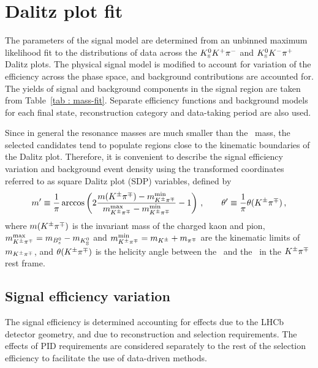 \section{Dalitz plot fit}
\label{sec:dalitz}

The parameters of the signal model are determined from an unbinned maximum likelihood fit to the distributions of data across the ${{K}^0_{\mathrm{ \scriptscriptstyle S}}}{{K}^+}{{\pi}^-}$ and ${{K}^0_{\mathrm{ \scriptscriptstyle S}}}{{K}^-}{{\pi}^+}$ Dalitz plots.  
The physical signal model is modified to account for variation of the efficiency across the phase space, and background contributions are accounted for.
The yields of signal and background components in the signal region are taken from Table~\ref{tab : mass-fit}.
Separate efficiency functions and background models for each final state, \KS reconstruction category and data-taking period are also used.

Since in general the resonance masses are much smaller than the \Bs\ mass, 
the selected candidates tend to populate regions close to the kinematic boundaries of the Dalitz plot.
Therefore, it is convenient to describe the signal efficiency variation and background event density using the transformed coordinates referred to as square Dalitz plot (SDP) variables, defined by
\begin{equation}
\label{eq:sqdp-vars}
m^{\prime} \equiv \frac{1}{\pi}
\arccos\left(2\frac{m({{K}^\pm}{{\pi}^\mp}) - m^{\rm min}_{{{K}^\pm}{{\pi}^\mp}}}{m^{\rm max}_{{{K}^\pm}{{\pi}^\mp}} - m^{\rm min}_{{{K}^\pm}{{\pi}^\mp}}} - 1 \right)\,, 
\qquad
\theta^{\prime} \equiv \frac{1}{\pi}\theta({{K}^\pm}{{\pi}^\mp})\,,
\end{equation}
where $m({{K}^\pm}{{\pi}^\mp})$ is the invariant mass of the charged kaon and pion,
$m^{\rm max}_{{{K}^\pm}{{\pi}^\mp}} = m_{{{B}^0_{s}}} - m_{{{K}^0_{\mathrm{ \scriptscriptstyle S}}}}$ and
$m^{\rm min}_{{{K}^\pm}{{\pi}^\mp}} = m_{{{K}^\pm}} + m_{{{\pi}^\mp}}$
are the kinematic limits of $m_{{{K}^\pm}{{\pi}^\mp}}$,
and $\theta({{K}^\pm}{{\pi}^\mp})$ is the helicity angle between the \pimp\ and the \KS\ in the ${{K}^\pm}{{\pi}^\mp}$ rest frame.

\subsection{Signal efficiency variation}

The signal efficiency is determined accounting for effects due to the LHCb detector geometry, and due to reconstruction and selection requirements.
The effects of PID requirements are considered separately to the rest of the selection efficiency to facilitate the use of data-driven methods. 

